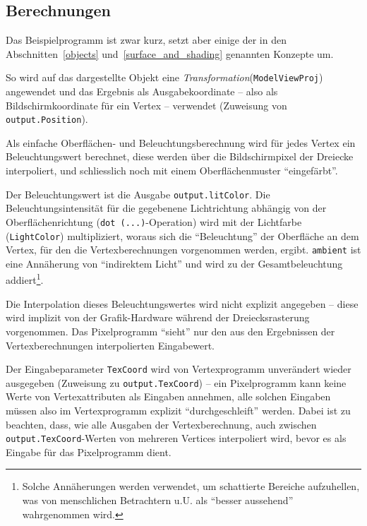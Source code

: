 \documentclass[twoside,a4paper,fleqn,12pt]{book}
\begin{document}
\subsection{Berechnungen}


Das Beispielprogramm ist zwar kurz, setzt aber einige der in den Abschnitten~\ref{objects} und~\ref{surface_and_shading} genannten Konzepte um.

So wird auf das dargestellte Objekt eine \emph{Transformation}(\verb+ModelViewProj+) angewendet und das Ergebnis als Ausgabekoordinate --
also als Bildschirmkoordinate für ein Vertex -- verwendet (Zuweisung von \verb+output.Position+).

Als einfache Oberflächen- und Beleuchtungsberechnung wird für jedes Vertex ein Beleuchtungswert berechnet, diese werden über die Bildschirmpixel
der Dreiecke interpoliert, und schliesslich noch mit einem Oberflächenmuster "`eingefärbt"'.

Der Beleuchtungswert ist die Ausgabe \verb+output.litColor+. Die Beleuchtungsintensität für die gegebenene Lichtrichtung abhängig von der Oberflächenrichtung
(\verb+dot (...)+-Operation) wird mit der Lichtfarbe (\verb+LightColor+) multipliziert, woraus sich die "`Beleuchtung"' der Oberfläche an dem
Vertex, für den die Vertexberechnungen vorgenommen werden, ergibt. \verb+ambient+ ist eine Annäherung von "`indirektem Licht"' und wird
zu der Gesamtbeleuchtung addiert\footnote{Solche Annäherungen werden verwendet, um schattierte Bereiche aufzuhellen, was von
menschlichen Betrachtern u.U. als "`besser aussehend"' wahrgenommen wird.}.

Die Interpolation dieses Beleuchtungswertes wird nicht explizit angegeben -- diese wird implizit von der Grafik-Hardware während der Dreiecksrasterung
vorgenommen. Das Pixelprogramm "`sieht"' nur den aus den Ergebnissen der Vertexberechnungen interpolierten Eingabewert.

Der Eingabeparameter \verb+TexCoord+ wird von Vertexprogramm unverändert wieder ausgegeben (Zuweisung zu \verb+output.TexCoord+) --
ein Pixelprogramm kann keine Werte von Vertexattributen als Eingaben annehmen, alle solchen Eingaben müssen also im Vertexprogramm
explizit "`durchgeschleift"' werden. Dabei ist zu beachten, dass, wie alle Ausgaben der Vertexberechnung, auch zwischen \verb+output.TexCoord+-Werten
von mehreren Vertices interpoliert wird, bevor es als Eingabe für das Pixelprogramm dient.
\end{document}

